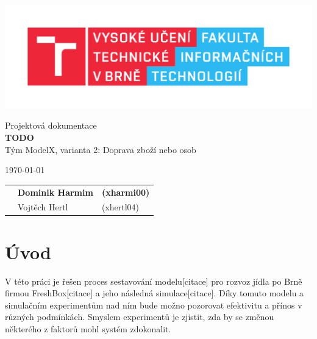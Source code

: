 \documentclass[a4paper, 11pt]{article}
\begin{document}
	\begin{titlepage}
		\begin{center}
			\includegraphics[width=0.77\linewidth]{inc/FIT_logo.pdf} \\


			\Huge{Projektová dokumentace} \\
			\LARGE{\textbf{TODO }} \\
			\Large{Tým ModelX, varianta 2: Doprava zboží nebo osob}
		\end{center}

		\begin{minipage}{0.4 \textwidth}
			{\Large \today}
		\end{minipage}
		\hfill
		\begin{minipage}[r]{0.6 \textwidth}
			\Large
			\begin{tabular}{l l l}
				& \textbf{Dominik Harmim} & \textbf{(xharmi00)} \\
				& Vojtěch Hertl & (xhertl04) \\
			\end{tabular}
		\end{minipage}
	\end{titlepage}



	\setcounter{page}{1}
	\tableofcontents
	\clearpage



	\setcounter{page}{1}

	\section{Úvod}

	V této práci je řešen proces sestavování modelu[citace] pro rozvoz jídla po Brně firmou FreshBox[citace] a jeho následná simulace[citace]. Díky tomuto modelu a simulačním experimentům nad ním bude možno pozorovat efektivitu a přínos v různých podmínkách. Smyslem experimentů je zjistit, zda by se změnou některého z faktorů mohl systém zdokonalit.
\end{document}
